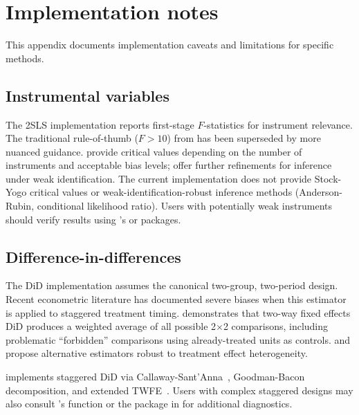\section{Implementation notes} \label{app:implementation}
\setcounter{table}{0}
\setcounter{figure}{0}

This appendix documents implementation caveats and limitations for specific
methods.

\subsection{Instrumental variables}

The 2SLS implementation reports first-stage $F$-statistics for instrument
relevance. The traditional rule-of-thumb ($F > 10$) from \cite{Staiger+Stock:1997}
has been superseded by more nuanced guidance. \cite{Stock+Yogo:2005} provide
critical values depending on the number of instruments and acceptable bias
levels; \cite{Lee+etal:2022} offer further refinements for inference under
weak identification. The current implementation does not provide Stock-Yogo
critical values or weak-identification-robust inference methods (Anderson-Rubin,
conditional likelihood ratio). Users with potentially weak instruments should
verify results using 's  or  packages.

\subsection{Difference-in-differences}

The DiD implementation assumes the canonical two-group, two-period design.
Recent econometric literature has documented severe biases when this estimator
is applied to staggered treatment timing. \cite{Goodman-Bacon:2021} demonstrates
that two-way fixed effects DiD produces a weighted average of all possible 2$\times$2
comparisons, including problematic ``forbidden'' comparisons using already-treated
units as controls. \cite{deChaisemartin+DHaultfoeuille:2020} and
\cite{Sun+Abraham:2021} propose alternative estimators robust to treatment
effect heterogeneity.

 implements staggered DiD via
Callaway-Sant'Anna~\citep{Callaway+SantAnna:2021}, Goodman-Bacon decomposition, and extended
TWFE~\citep{Wooldridge:2021}. Users with complex staggered designs may also
consult 's  function or the  package in
 for additional diagnostics.

